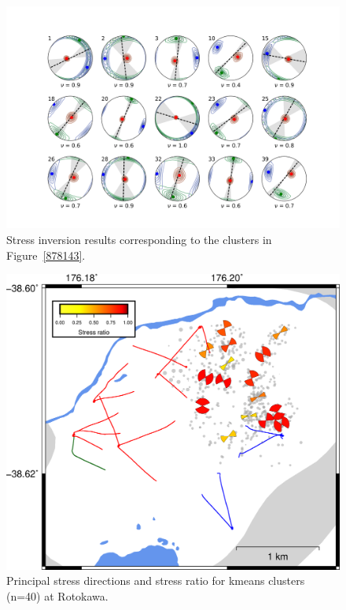 \begin{figure}[h!]
\begin{center}
\includegraphics[width=1.00\columnwidth]{Chapter_5_FMs/figures/Rot_kmeans_inversion_40/Rot_kmeans_inversion_40_original}
\caption{{Stress inversion results corresponding to the clusters in
Figure~{\ref{878143}}.
{\label{434168}}%
}}
\end{center}
\end{figure}

\begin{figure}[h!]
\begin{center}
\includegraphics[width=0.84\columnwidth]{Chapter_5_FMs/figures/merc_Rot_kmeans_cents_40_sigmas_seis_nu/merc_Rot_kmeans_clust_50_cents_SHmax_nu_original}
\caption{{Principal stress directions and stress ratio for kmeans clusters (n=40)
at Rotokawa.
{\label{533041}}%
}}
\end{center}
\end{figure}

